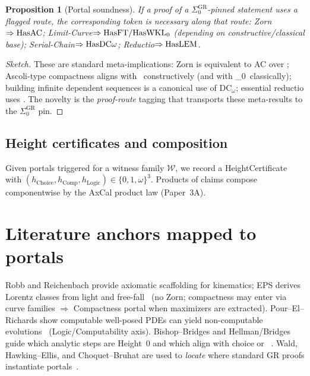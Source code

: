 \documentclass[11pt]{article}
\newtheorem{proposition}[theorem]{Proposition}
\theoremstyle{definition}
\theoremstyle{remark}
\newcommand{\ZF}{\mathsf{ZF}}
\newcommand{\LEM}{\mathrm{LEM}}
\newcommand{\FT}{\mathrm{FT}}
\newcommand{\WKLz}{\mathrm{WKL}_0}
\newcommand{\DCw}{\mathrm{DC}_\omega}
\newcommand{\SigmaZero}{\Sigma_{0}}
\newcommand{\hChoice}{h_{\mathrm{Choice}}}    %
\newcommand{\hComp}{h_{\mathrm{Comp}}}        %
\newcommand{\hLogic}{h_{\mathrm{Logic}}}      %
\begin{document}
\begin{proposition}[Portal soundness]\label{prop:portals}
If a proof of a $\SigmaZero^{\mathrm{GR}}$-pinned statement uses a flagged route, the corresponding token is necessary along that route: Zorn$\Rightarrow{\rm HasAC}$; Limit-Curve$\Rightarrow{\rm HasFT}/{\rm HasWKL}_0$ (depending on constructive/classical base); Serial-Chain$\Rightarrow{\rm HasDC}\omega$; Reductio$\Rightarrow{\rm HasLEM}$.
\end{proposition}

\begin{proof}[Sketch]
These are standard meta-implications: Zorn is equivalent to AC over \ZF; Ascoli-type compactness aligns with \FT\ constructively (and with \WKLz\ classically); building infinite dependent sequences is a canonical use of $\DCw$; essential reductio uses \LEM. The novelty is the \emph{proof-route} tagging that transports these meta-results to the $\SigmaZero^{\mathrm{GR}}$ pin.
\end{proof}

\subsection{Height certificates and composition}
Given portals triggered for a witness family $\mathcal{W}$, we record a HeightCertificate with $(\hChoice,\hComp,\hLogic)\in\{0,1,\omega\}^3$. Products of claims compose componentwise by the AxCal product law (Paper~3A).

\section{Literature anchors mapped to portals}
Robb and Reichenbach provide axiomatic scaffolding for kinematics; EPS derives Lorentz classes from light and free-fall~\cite{Robb1914,Reichenbach1969,EPS1972} (no Zorn; compactness may enter via curve families $\Rightarrow$ Compactness portal when maximizers are extracted). Pour--El--Richards show computable well-posed PDEs can yield non-computable evolutions~\cite{PourElRichards1989} (Logic/Computability axis). Bishop--Bridges and Hellman/Bridges guide which analytic steps are Height~0 and which align with choice or \LEM~\cite{BishopBridges1985,Hellman1998,BridgesReply1995}. Wald, Hawking--Ellis, and Choquet--Bruhat are used to \emph{locate} where standard GR proofs instantiate portals~\cite{Wald1984,HawkingEllis1973,ChoquetBruhat2009}.
\end{document}
